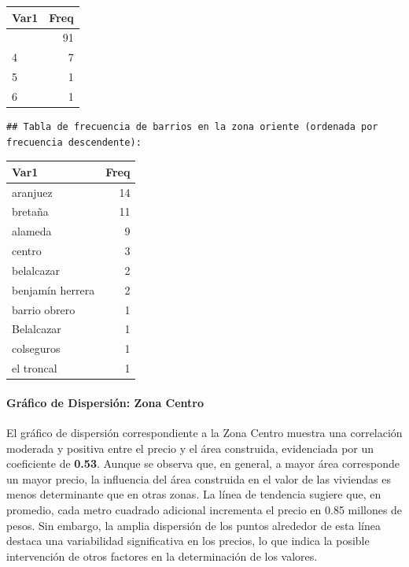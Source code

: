 \documentclass[
]{article}
\begin{document}
\begin{longtable}[]{@{}lr@{}}
\toprule\noalign{}
Var1 & Freq \\
\midrule\noalign{}
\endhead
\bottomrule\noalign{}
\endlastfoot
3 & 91 \\
4 & 7 \\
5 & 1 \\
6 & 1 \\
\end{longtable}

\begin{verbatim}
## Tabla de frecuencia de barrios en la zona oriente (ordenada por frecuencia descendente):
\end{verbatim}

\begin{longtable}[]{@{}lr@{}}
\toprule\noalign{}
Var1 & Freq \\
\midrule\noalign{}
\endhead
\bottomrule\noalign{}
\endlastfoot
aranjuez & 14 \\
bretaña & 11 \\
alameda & 9 \\
centro & 3 \\
belalcazar & 2 \\
benjamín herrera & 2 \\
barrio obrero & 1 \\
Belalcazar & 1 \\
colseguros & 1 \\
el troncal & 1 \\
\end{longtable}

\paragraph{\texorpdfstring{\textbf{Gráfico de Dispersión: Zona
Centro}}{Gráfico de Dispersión: Zona Centro}}\label{gruxe1fico-de-dispersiuxf3n-zona-centro}

El gráfico de dispersión correspondiente a la Zona Centro muestra una
correlación moderada y positiva entre el precio y el área construida,
evidenciada por un coeficiente de \textbf{0.53}. Aunque se observa que,
en general, a mayor área corresponde un mayor precio, la influencia del
área construida en el valor de las viviendas es menos determinante que
en otras zonas. La línea de tendencia sugiere que, en promedio, cada
metro cuadrado adicional incrementa el precio en 0.85 millones de pesos.
Sin embargo, la amplia dispersión de los puntos alrededor de esta línea
destaca una variabilidad significativa en los precios, lo que indica la
posible intervención de otros factores en la determinación de los
valores.
\end{document}
